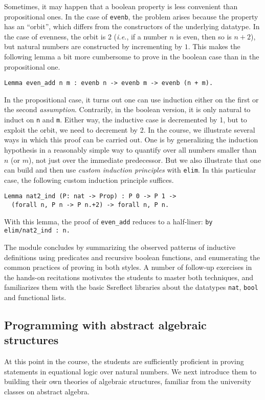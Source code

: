 \documentclass[blockstyle,preprint,nocopyrightspace]{sigplanconf}
\newcommand{\is}[1]{\textcolor{blue}{(Ilya: {#1})}}
\newcommand{\an}[1]{\textcolor{red}{(Aleks: {#1})}}
\newcommand{\code}[1]{\lstinline{#1}}
\newcommand{\ie}{\emph{i.e.}\xspace}
\begin{document}
Sometimes, it may happen that a boolean property is less convenient
than propositional ones. In the case of \code{evenb}, the problem
arises because the property has an ``orbit'', which differs from the
constructors of the underlying datatype. In the case of evenness, the
orbit is 2 (\ie, if a number $n$ is even, then so is $n+2$), but
natural numbers are constructed by incrementing by $1$. This makes the
following lemma a bit more cumbersome to prove in the boolean case
than in the propositional one.
%
\begin{lstlisting}
Lemma even_add n m : evenb n -> evenb m -> evenb (n + m).
\end{lstlisting}
%
In the propositional case, it turns out one can use induction either
on the first or the second \emph{assumption}. Contrarily, in the
boolean version, it is only natural to induct on \code{n} and
\code{m}. Either way, the inductive case is decremented by 1, but to
exploit the orbit, we need to decrement by 2. In the course, we
illustrate several ways in which this proof can be carried out. One is
by generalizing the induction hypothesis in a reasonably simple way to
quantify over all numbers smaller than $n$ (or $m$), not just over the
immediate predecessor. But we also illustrate that one can build and
then use \emph{custom induction principles} with \code{elim}. In this
particular case, the following custom induction principle suffices.
%
\begin{lstlisting}
Lemma nat2_ind (P: nat -> Prop) : P 0 -> P 1 -> 
  (forall n, P n -> P n.+2) -> forall n, P n.
\end{lstlisting}
%
With this lemma, the proof of \code{even_add} reduces to a half-liner:
\code{by elim/nat2_ind : n.}

The module concludes by summarizing the observed patterns of inductive
definitions using predicates and recursive boolean functions, and
enumerating the common practices of proving in both styles. A number
of follow-up exercises in the hands-on recitations motivates the
students to master both techniques, and familiarizes them with the
basic Ssreflect libraries about the datatypes \code{nat}, \code{bool}
and functional lists.
%

\subsection{Programming with abstract algebraic structures}
\label{sec:depstruct}
At this point in the course, the students are sufficiently proficient
in proving statements in equational logic over natural numbers. We
next introduce them to building their own theories of algebraic
structures, familiar from the university classes on abstract algebra.
\end{document}

